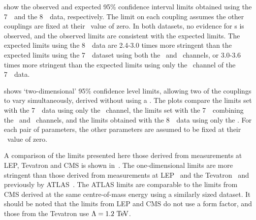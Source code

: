  show the observed and
expected 95\% confidence interval limits obtained using the 7~\tev\ and the
8~\tev\ data, respectively. The limit on each coupling assumes the other
couplings are fixed at their \sm\ value of zero. In both datasets, no evidence
for \TGC s is observed, and the observed limits are consistent with the expected
limits. The expected limits using the 8~\tev\ data are 2.4-3.0 times more
stringent than the expected limits using the 7~\tev\ dataset using both the
\ZZllll\ and \ZZllvv\ channels, or 3.0-3.6 times more stringent than the
expected limits using only the \ZZllll\ channel of the 7~\tev\ data.

 shows `two-dimensional' 95\%
confidence level limits, allowing two of the couplings to vary simultaneously,
derived without using a \formfactor. The plots compare the limits set
with the 7~\tev\ data using only the \ZZllll\ channel, the limits set with the 7~\tev\ combining the \ZZllll\ and \ZZllvv\
channels, and the limits obtained with the 8~\tev\
data using only the \ZZllll. For each pair of parameters, the other parameters
are assumed to be fixed at their \sm\ value of zero. 


A comparison of the limits presented here those derived from measurements at
LEP, Tevatron and CMS is shown in~.  The one-dimensional
limits are more stringent than those derived from measurements at
LEP~\cite{bib:LEPEW2006} and the Tevatron~\cite{Abazov:2007ad} and previously by
ATLAS~\cite{ATLAS_ZZ4l:1fb2011}. The ATLAS \sqrtseq{7} limits are comparable to
the limits from CMS derived at the same centre-of-mass energy using a similarly
sized dataset. It should be noted that the limits from LEP and CMS do not use a
form factor, and those from the Tevatron use $\Lambda = 1.2\TeV$.

